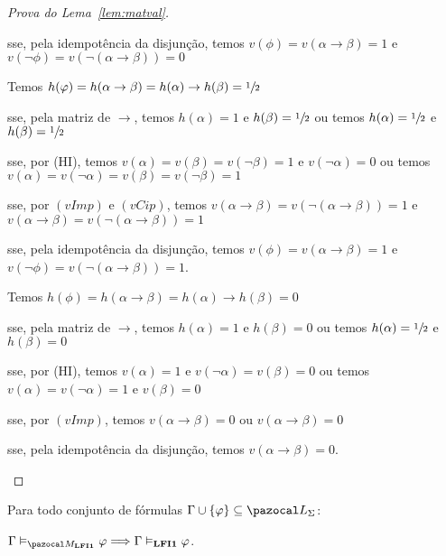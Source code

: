 \begin{proof}[Prova do Lema~\ref{lem:matval}]
\begin{provaporcasos}
\begin{provaporsubcasos}
                    \qquad{}sse, pela idempotência da disjunção, temos $v(\phi) = v(\alpha \to \beta) = 1$ e $v(\neg \phi) = v(\neg (\alpha \to \beta)) = 0$


                    Temos $h(\varphi) = h(\alpha \to \beta) = h(\alpha) \to h(\beta) = \sfrac{1}{2}{}$

                    \qquad{}sse, pela matriz de $\to$, temos $h(\alpha) = 1$ e $h(\beta) = \sfrac{1}{2}{}$ ou temos $h(\alpha) = \sfrac{1}{2}{}$ e $h(\beta) = \sfrac{1}{2}{}$

                    \qquad{}sse, por (HI), temos $v(\alpha) = v(\beta) = v(\neg \beta) = 1$ e $v(\neg \alpha) = 0$ ou temos $v(\alpha) = v(\neg \alpha) = v(\beta) = v(\neg \beta) = 1$

                    \qquad{}sse, por $(vImp)$ e $(vCip)$, temos $v(\alpha \to \beta) = v(\neg (\alpha \to \beta)) = 1$ e $v(\alpha \to \beta) = v(\neg (\alpha \to \beta)) = 1$

                    \qquad{}sse, pela idempotência da disjunção, temos $v(\phi) = v(\alpha \to \beta) = 1$ e $v(\neg \phi) = v(\neg (\alpha \to \beta)) = 1$.


                    Temos $h(\phi) = h(\alpha \to \beta) = h(\alpha) \to h(\beta) = 0$

                    \qquad{}sse, pela matriz de $\to$, temos $h(\alpha) = 1$ e $h(\beta) = 0$ ou temos $h(\alpha) = \sfrac{1}{2}{}$ e $h(\beta) = 0$

                    \qquad{}sse, por (HI), temos $v(\alpha) = 1$ e $v(\neg \alpha) = v(\beta) = 0$ ou temos $v(\alpha) = v(\neg \alpha) = 1$ e $v(\beta) = 0$

                    \qquad{}sse, por $(vImp)$, temos $v(\alpha \to \beta) = 0$ ou $v(\alpha \to \beta) = 0$

                    \qquad{}sse, pela idempotência da disjunção, temos $v(\alpha \to \beta) = 0$.
            \end{provaporsubcasos}
        \end{provaporcasos}
    \end{proof}

    \begin{corolario}\label{cor:matval}
        Para todo conjunto de fórmulas $\Gamma \cup \{\phi\} \subseteq \ling{}$:

        \centering
        $\Gamma \conmat \phi \Longrightarrow \Gamma \conval \phi$. 
    \end{corolario}

